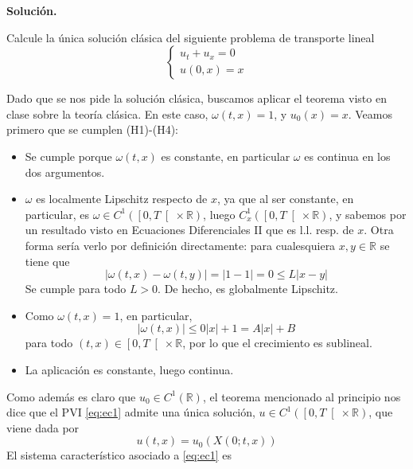 \documentclass[12pt]{article}
\newcommand{\R}{\mathbb{R}}
\begin{document}
    \newpage
    \setcounter{ejercicio}{0} %
    \noindent
    \textbf{Solución.}

    \begin{ejercicio}
        Calcule la única solución clásica del siguiente problema de transporte lineal
        \begin{equation}\label{eq:ec1}
            \begin{cases}
                u_t + u_x = 0 \\
                u(0,x) = x
            \end{cases}
        \end{equation}

        Dado que se nos pide la solución clásica, buscamos aplicar el teorema visto en clase sobre la teoría clásica.
        En este caso, $\omega(t,x) = 1$, y $u_0(x) = x$. Veamos primero que se cumplen (H1)-(H4):
        \begin{itemize}
            \item[(H1)] Se cumple porque $\omega(t,x)$ es constante, en particular $\omega$ es continua en los dos argumentos.
            \item[(H2)] $\omega$ es localmente Lipschitz respecto de $x$, ya que al ser constante, 
            en particular, es $\omega \in C^1(\left[0,T \right[ \times \R)$, luego $C^1_x(\left[0,T \right[ \times \R)$, y sabemos por un resultado visto en Ecuaciones Diferenciales II que es l.l. resp. de $x$.
            Otra forma sería verlo por definición directamente: para cualesquiera $x,y \in \R$ se tiene que
            $$|\omega(t,x) - \omega(t,y)| = |1-1| = 0 \leq L|x-y|$$
            Se cumple para todo $L>0$. De hecho, es globalmente Lipschitz.
            \item[(H3)] Como $\omega(t,x) = 1$, en particular, $$|\omega(t,x)| \leq 0|x| + 1 = A|x| + B$$
            para todo $(t,x) \in \left[0, T \right[ \times \R$, por lo que el crecimiento es sublineal.
            \item[(H4)] La aplicación \Func{\dfrac{\partial \omega}{\partial x}}{\left[0, T \right[ \times \R}{\R}{(t,x)}{\dfrac{\partial \omega}{\partial x}(t,x) = 0} es constante, luego continua.
        \end{itemize}
        Como además es claro que $u_0 \in C^1(\R)$, el teorema mencionado al principio nos dice que el PVI \eqref{eq:ec1} admite una única solución, 
        $u \in C^1(\left[0, T \right[ \times \R)$, que viene dada por 
        $$u(t,x) = u_0(X(0;t,x))$$ 
        El sistema característico asociado a \eqref{eq:ec1} es 

\end{ejercicio}
\end{document}
